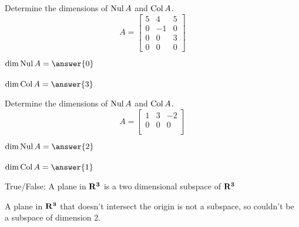\documentclass{ximera}
\newcommand{\RR}{\bf R}
\newcommand{\Col}{\mathop{\rm Col}}
\newcommand{\Nul}{\mathop{\rm Nul}}
\begin{document}
  	  		        \begin{question} Determine the dimensions of $\Nul A$ and $\Col A$.
  	  		        	$$A = \begin{bmatrix} 5&4&5\\ 0&-1 &0\\0&0&3\\0&0&0 \end{bmatrix}$$
  	  		        	
  	  		        	$\dim \Nul A =  \answer{0}$\\
  	  		        	\\
  	  		        	$\dim \Col A =  \answer{3}$\\
  	  		        	
  	  		        \end{question}	
  	  		             \begin{question} Determine the dimensions of $\Nul A$ and $\Col A$.
  	  		             	$$A = \begin{bmatrix} 1&3&-2\\ 0&0 &0\\ \end{bmatrix}$$
  	  		             	
  	  		             	$\dim \Nul A =  \answer{2}$\\
  	  		             	\\
  	  		             	$\dim \Col A =  \answer{1}$\\
  	  		             	
  	  		             \end{question}	
  
        \begin{question} True/False: A plane in $\RR^3$ is a two dimensional subspace of $\RR^3$
        	
        	\begin{multipleChoice}
        		\end{multipleChoice}
        	\vspace{10pt}
        	\begin{hint}
        		A plane in $\RR^3$ that doesn't intersect the origin is not a subspace, so couldn't be a subspace of dimension 2.
        		\end{hint}	
        		
        	
        \end{question}	
        
\end{document}
